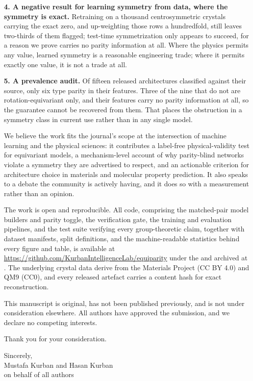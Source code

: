 \documentclass[11pt]{article}
\newcommand{\MISSING}[1]{}
\newcommand{\VERIFY}[1]{}
\newcommand{\MISSING}[1]{\textcolor{red}{[MISSING: #1]}}
\newcommand{\VERIFY}[1]{\textcolor{red}{[VERIFY: #1]}}
\begin{document}
\textbf{4. A negative result for learning symmetry from data, where the symmetry is exact.} Retraining on a thousand centrosymmetric crystals carrying the exact zero, and up-weighting those rows a hundredfold, still leaves two-thirds of them flagged; test-time symmetrization only appears to succeed, for a reason we prove carries no parity information at all. Where the physics permits any value, learned symmetry is a reasonable engineering trade; where it permits exactly one value, it is not a trade at all.

\textbf{5. A prevalence audit.} Of fifteen released architectures classified against their source, only six type parity in their features. Three of the nine that do not are rotation-equivariant only, and their features carry no parity information at all, so the guarantee cannot be recovered from them. That places the obstruction in a symmetry class in current use rather than in any single model.

We believe the work fits the journal's scope at the intersection of machine learning and the physical sciences: it contributes a label-free physical-validity test for equivariant models, a mechanism-level account of why parity-blind networks violate a symmetry they are advertised to respect, and an actionable criterion for architecture choice in materials and molecular property prediction. It also speaks to a debate the community is actively having, and it does so with a measurement rather than an opinion.

The work is open and reproducible. All code, comprising the matched-pair model builders and parity toggle, the verification gate, the training and evaluation pipelines, and the test suite verifying every group-theoretic claim, together with dataset manifests, split definitions, and the machine-readable statistics behind every figure and table, is available at \url{https://github.com/KurbanIntelligenceLab/equiparity} under the \VERIFY{state the licence; confirm it matches the Code availability statement in the manuscript} and archived at \MISSING{persistent DOI of the archived release}. The underlying crystal data derive from the Materials Project (CC BY 4.0) and QM9 (CC0), and every released artefact carries a content hash for exact reconstruction.

\MISSING{preprint status: state whether the manuscript is or will be posted to arXiv, and give the identifier if so}

\MISSING{suggested reviewers: Nature Communications invites the names and contact details of suitable independent referees, and allows authors to request the exclusion of specific referees. Supply them, or state that you have none to suggest}

This manuscript is original, has not been published previously, and is not under consideration elsewhere. All authors have approved the submission, and we declare no competing interests.

Thank you for your consideration.

Sincerely,\\
Mustafa Kurban and Hasan Kurban\\
on behalf of all authors
\end{document}
